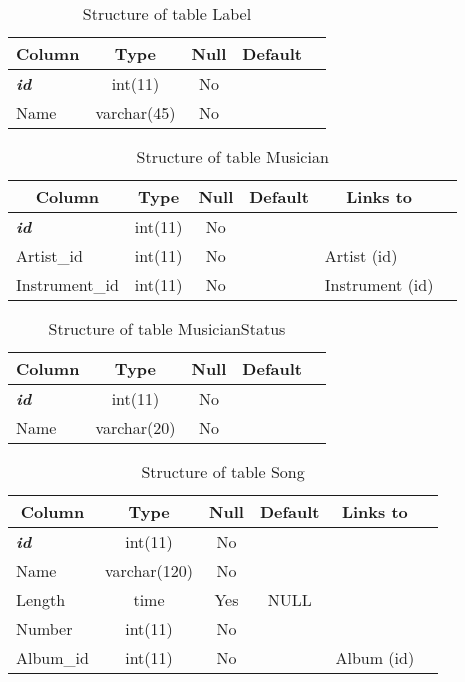 %
%
 \begin{longtable}{|l|c|c|c|l|} 
 \caption{Structure of table Label} \label{tab:Label-structure} \\
 \hline \multicolumn{1}{|c|}{\textbf{Column}} & \multicolumn{1}{|c|}{\textbf{Type}} & \multicolumn{1}{|c|}{\textbf{Null}} & \multicolumn{1}{|c|}{\textbf{Default}} \\ \hline \hline
\textbf{\textit{id}} & int(11) & No &  \\ \hline 
Name & varchar(45) & No &  \\ \hline 
 \end{longtable}

%
%
 \begin{longtable}{|l|c|c|c|l|l|} 
 \caption{Structure of table Musician} \label{tab:Musician-structure} \\
 \hline \multicolumn{1}{|c|}{\textbf{Column}} & \multicolumn{1}{|c|}{\textbf{Type}} & \multicolumn{1}{|c|}{\textbf{Null}} & \multicolumn{1}{|c|}{\textbf{Default}} & \multicolumn{1}{|c|}{\textbf{Links to}} \\ \hline \hline
\textbf{\textit{id}} & int(11) & No &  &  \\ \hline 
Artist\_id & int(11) & No &  & Artist (id) \\ \hline 
Instrument\_id & int(11) & No &  & Instrument (id) \\ \hline 
 \end{longtable}

%
%
 \begin{longtable}{|l|c|c|c|l|} 
 \caption{Structure of table MusicianStatus} \label{tab:MusicianStatus-structure} \\
 \hline \multicolumn{1}{|c|}{\textbf{Column}} & \multicolumn{1}{|c|}{\textbf{Type}} & \multicolumn{1}{|c|}{\textbf{Null}} & \multicolumn{1}{|c|}{\textbf{Default}} \\ \hline \hline
\textbf{\textit{id}} & int(11) & No &  \\ \hline 
Name & varchar(20) & No &  \\ \hline 
 \end{longtable}

%
%
 \begin{longtable}{|l|c|c|c|l|l|} 
 \caption{Structure of table Song} \label{tab:Song-structure} \\
 \hline \multicolumn{1}{|c|}{\textbf{Column}} & \multicolumn{1}{|c|}{\textbf{Type}} & \multicolumn{1}{|c|}{\textbf{Null}} & \multicolumn{1}{|c|}{\textbf{Default}} & \multicolumn{1}{|c|}{\textbf{Links to}} \\ \hline \hline
\textbf{\textit{id}} & int(11) & No &  &  \\ \hline 
Name & varchar(120) & No &  &  \\ \hline 
Length & time & Yes & NULL &  \\ \hline 
Number & int(11) & No &  &  \\ \hline 
Album\_id & int(11) & No &  & Album (id) \\ \hline 
 \end{longtable}

